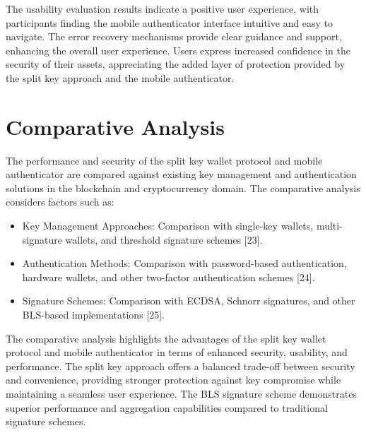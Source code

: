 The usability evaluation results indicate a positive user experience, with participants finding the mobile authenticator interface intuitive and easy to navigate. The error recovery mechanisms provide clear guidance and support, enhancing the overall user experience. Users express increased confidence in the security of their assets, appreciating the added layer of protection provided by the split key approach and the mobile authenticator.

\section{Comparative Analysis}
The performance and security of the split key wallet protocol and mobile authenticator are compared against existing key management and authentication solutions in the blockchain and cryptocurrency domain. The comparative analysis considers factors such as:
\begin{itemize}
    \item Key Management Approaches: Comparison with single-key wallets, multi-signature wallets, and threshold signature schemes [23].
    \item Authentication Methods: Comparison with password-based authentication, hardware wallets, and other two-factor authentication schemes [24].
    \item Signature Schemes: Comparison with ECDSA, Schnorr signatures, and other BLS-based implementations [25].
\end{itemize}

The comparative analysis highlights the advantages of the split key wallet protocol and mobile authenticator in terms of enhanced security, usability, and performance. The split key approach offers a balanced trade-off between security and convenience, providing stronger protection against key compromise while maintaining a seamless user experience. The BLS signature scheme demonstrates superior performance and aggregation capabilities compared to traditional signature schemes.


